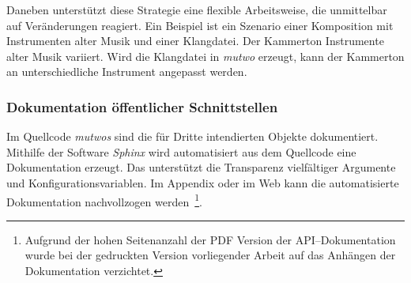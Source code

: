 \documentclass[12pt,a4paper,ngerman]{article}
\begin{document}

\begin{center}
\end{center}

Daneben unterstützt diese Strategie eine flexible Arbeitsweise, die unmittelbar auf Veränderungen reagiert.
Ein Beispiel ist ein Szenario einer Komposition mit Instrumenten alter Musik und einer Klangdatei.
Der Kammerton Instrumente alter Musik variiert.
Wird die Klangdatei in \emph{mutwo} erzeugt, kann der Kammerton an unterschiedliche Instrument angepasst werden.

\subsubsection{Dokumentation öffentlicher Schnittstellen}

Im Quellcode \emph{mutwos} sind die für Dritte intendierten Objekte dokumentiert.
Mithilfe der Software \emph{Sphinx} wird automatisiert aus dem Quellcode eine Dokumentation erzeugt.
Das unterstützt die Transparenz vielfältiger Argumente und Konfigurationsvariablen.
Im Appendix oder im Web kann die automatisierte Dokumentation nachvollzogen werden~\footnote{%
    Aufgrund der hohen Seitenanzahl der PDF Version der API--Dokumentation wurde bei der gedruckten Version vorliegender Arbeit auf das Anhängen der Dokumentation verzichtet.
}.
\end{document}
